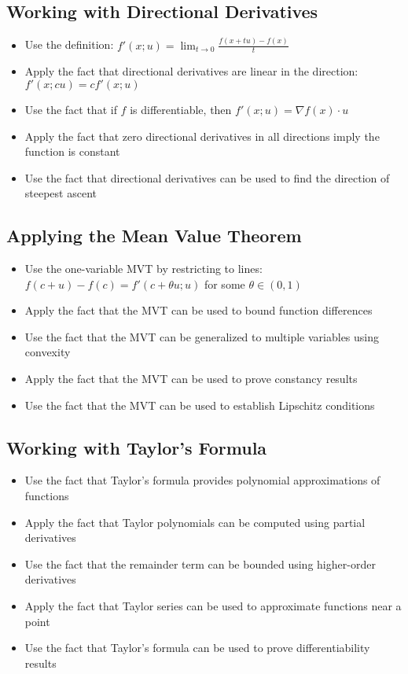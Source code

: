 \subsection*{Working with Directional Derivatives}
\begin{itemize}
\item Use the definition: $f'(x;u) = \lim_{t \to 0} \frac{f(x + tu) - f(x)}{t}$
\item Apply the fact that directional derivatives are linear in the direction: $f'(x;cu) = cf'(x;u)$
\item Use the fact that if $f$ is differentiable, then $f'(x;u) = \nabla f(x) \cdot u$
\item Apply the fact that zero directional derivatives in all directions imply the function is constant
\item Use the fact that directional derivatives can be used to find the direction of steepest ascent
\end{itemize}

\subsection*{Applying the Mean Value Theorem}
\begin{itemize}
\item Use the one-variable MVT by restricting to lines: $f(c+u) - f(c) = f'(c+\theta u;u)$ for some $\theta \in (0,1)$
\item Apply the fact that the MVT can be used to bound function differences
\item Use the fact that the MVT can be generalized to multiple variables using convexity
\item Apply the fact that the MVT can be used to prove constancy results
\item Use the fact that the MVT can be used to establish Lipschitz conditions
\end{itemize}

\subsection*{Working with Taylor's Formula}
\begin{itemize}
\item Use the fact that Taylor's formula provides polynomial approximations of functions
\item Apply the fact that Taylor polynomials can be computed using partial derivatives
\item Use the fact that the remainder term can be bounded using higher-order derivatives
\item Apply the fact that Taylor series can be used to approximate functions near a point
\item Use the fact that Taylor's formula can be used to prove differentiability results
\end{itemize}